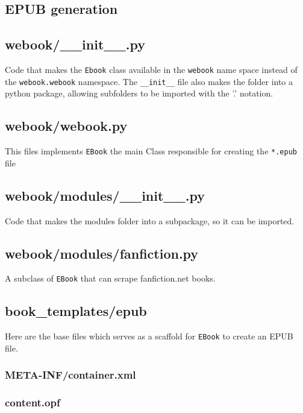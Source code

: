 \documentclass[]{report}   %
\begin{document}
\begin{appendices}
\chapter{EPUB generation}
    \section{webook/\_\_init\_\_.py}
    Code that makes the \texttt{Ebook} class available in the \texttt{webook}
    name space instead of the \texttt{webook.webook} namespace. The
    \texttt{\_\_init\_\_} file also makes the folder into a python package,
    allowing subfolders to be imported with the '.' notation.

    \section{webook/webook.py}
    This files implements \texttt{EBook} the main Class responsible for
    creating the \texttt{*.epub} file

    \section{webook/modules/\_\_init\_\_.py}
    Code that makes the modules folder into a subpackage, so it can be imported.
    
    \section{webook/modules/fanfiction.py}
    A subclass of \texttt{EBook} that can scrape fanfiction.net books.

    \section{book\_templates/epub}
    Here are the base files which serves as a scaffold for \texttt{EBook} to create an EPUB file.
        \subsection{META-INF/container.xml}
        

        \subsection{content.opf}
        


\end{appendices}
\end{document}
